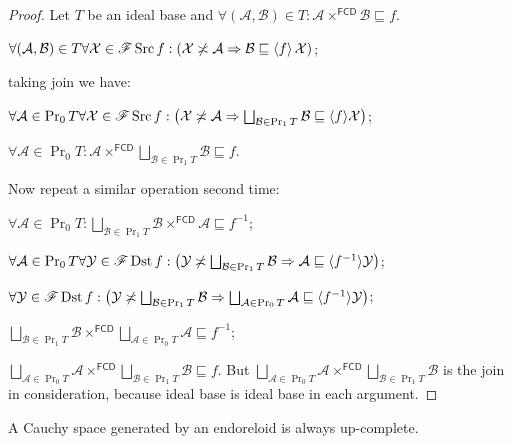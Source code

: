\begin{proof}
  Let $T$ be an ideal base and $\forall (\mathcal{A} , \mathcal{B}) \in T :
  \mathcal{A} \times^{\mathsf{FCD}} \mathcal{B} \sqsubseteq f$.
  
  $\forall (\mathcal{A} , \mathcal{B}) \in T \forall \mathcal{X} \in
  \mathscr{F} \operatorname{Src} f : (\mathcal{X} \not\asymp \mathcal{A} \Rightarrow
  \mathcal{B} \sqsubseteq \left\langle f\right\rangle \mathcal{X})$;
  
  taking join we have:
  
  $\forall \mathcal{A} \in \Pr_0 T \forall \mathcal{X} \in \mathscr{F}
  \Src f : \left( \mathcal{X} \nasymp \mathcal{A} \Rightarrow
  \bigsqcup_{\mathcal{B} \in \Pr_1 T} \mathcal{B} \sqsubseteq \langle f
  \rangle \mathcal{X} \right)$;
  
  $\forall \mathcal{A} \in \Pr_0 T : \mathcal{A} \times^{\mathsf{FCD}}
  \bigsqcup_{\mathcal{B} \in \Pr_1 T} \mathcal{B} \sqsubseteq f$.
  
  Now repeat a similar operation second time:
  
  $\forall \mathcal{A} \in \Pr_0 T : \bigsqcup_{\mathcal{B} \in \Pr_1 T}
  \mathcal{B} \times^{\mathsf{FCD}} \mathcal{A} \sqsubseteq f^{- 1}$;
  
  $\forall \mathcal{A} \in \Pr_0 T \forall \mathcal{Y} \in \mathscr{F}
  \Dst f : \left( \mathcal{Y} \nasymp \bigsqcup_{\mathcal{B} \in \Pr_1
  T} \mathcal{B} \Rightarrow \mathcal{A} \sqsubseteq \langle f^{- 1} \rangle
  \mathcal{Y} \right)$;
  
  $\forall \mathcal{Y} \in \mathscr{F} \Dst f : \left( \mathcal{Y}
  \nasymp \bigsqcup_{\mathcal{B} \in \Pr_1 T} \mathcal{B} \Rightarrow
  \bigsqcup_{\mathcal{A} \in \Pr_0 T} \mathcal{A} \sqsubseteq \langle f^{- 1}
  \rangle \mathcal{Y} \right)$;
  
  $\bigsqcup_{\mathcal{B} \in \Pr_1 T} \mathcal{B}
  \times^{\mathsf{FCD}} \bigsqcup_{\mathcal{A} \in \Pr_0 T} \mathcal{A}
  \sqsubseteq f^{- 1}$;
  
  $\bigsqcup_{\mathcal{A} \in \Pr_0 T} \mathcal{A}
  \times^{\mathsf{FCD}} \bigsqcup_{\mathcal{B} \in \Pr_1 T} \mathcal{B}
  \sqsubseteq f$. But $\bigsqcup_{\mathcal{A} \in \Pr_0 T} \mathcal{A}
  \times^{\mathsf{FCD}} \bigsqcup_{\mathcal{B} \in \Pr_1 T}
  \mathcal{B}$ is the join in consideration, because ideal base is ideal base
  in each argument.
\end{proof}

\begin{prop}
  A Cauchy space generated by an endoreloid is always up-complete.
\end{prop}

